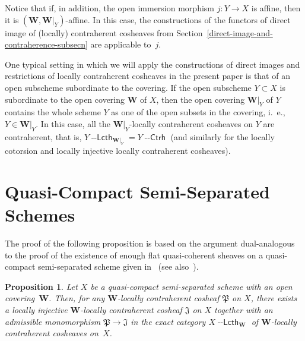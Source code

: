 \documentclass[12pt,a4paper]{amsart}
\newcommand{\+}{\nobreakdash-}
\renewcommand{\:}{\colon}
\newcommand{\rarrow}{\longrightarrow}
\newcommand{\Ctrh}{{\operatorname{\mathsf{--Ctrh}}}}
\newcommand{\Lcth}{{\operatorname{\mathsf{--Lcth}}}}
\newcommand{\bW}{\mathbf W}
\newcommand{\fJ}{\mathfrak J}
\newcommand{\fP}{\mathfrak P}
\newcommand{\Section}[1]{\bigskip\section{#1}\medskip}
\theoremstyle{plain}
\newtheorem{prop}[thm]{Proposition}
\theoremstyle{definition}
\begin{document}
 Notice that if, in addition, the open immersion morphism
$j\:Y\rarrow X$ is affine, then it is $(\bW,\bW|_Y)$\+affine.
 In this case, the constructions of the functors of direct image
of (locally) contraherent cosheaves from
Section~\ref{direct-image-and-contraherence-subsecn} are applicable
to~$j$.

 One typical setting in which we will apply the constructions of direct
images and restrictions of locally contraherent cosheaves in the present
paper is that of an open subscheme subordinate to the covering.
 If the open subscheme $Y\subset X$ is subordinate to the open covering
$\bW$ of $X$, then the open covering $\bW|_Y$ of $Y$ contains the whole
scheme $Y$ as one of the open subsets in the covering, i.~e.,
$Y\in\bW|_Y$.
 In this case, all the $\bW|_Y$\+locally contraherent cosheaves on $Y$
are contraherent, that is, $Y\Lcth_{\bW|_Y}=Y\Ctrh$ (and similarly for
the locally cotorsion and locally injective locally contraherent
cosheaves).


\Section{Quasi-Compact Semi-Separated Schemes}  \label{qcss-secn}

 The proof of the following proposition is based on the argument
dual-analogous to the proof of the existence of enough flat
quasi-coherent sheaves on a quasi-compact semi-separated scheme given
in~\cite[Lemma~A.1]{EP} (see also~\cite[Lemmas~4.1.1 and~4.1.8]{Pcosh}).

\begin{prop} \label{qcoh-ssep-enough-lin-prop}
 Let $X$ be a quasi-compact semi-separated scheme with an open
covering\/~$\bW$.
 Then, for any\/ $\bW$\+locally contraherent cosheaf\/ $\fP$ on $X$,
there exists a locally injective\/ $\bW$\+locally contraherent cosheaf\/
$\fJ$ on $X$ together with an admissible monomorphism\/ $\fP\rarrow\fJ$
in the exact category $X\Lcth_\bW$ of\/ $\bW$\+locally contraherent
cosheaves on~$X$.
\end{prop}
\end{document}
